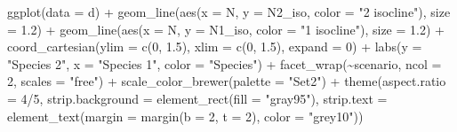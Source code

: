 \documentclass[
  letterpaper,
  DIV=11,
  numbers=noendperiod]{scrartcl}
\newenvironment{Shaded}{\begin{snugshade}}{\end{snugshade}}
\newcommand{\AttributeTok}[1]{\textcolor[rgb]{0.40,0.45,0.13}{#1}}
\newcommand{\DecValTok}[1]{\textcolor[rgb]{0.68,0.00,0.00}{#1}}
\newcommand{\FloatTok}[1]{\textcolor[rgb]{0.68,0.00,0.00}{#1}}
\newcommand{\FunctionTok}[1]{\textcolor[rgb]{0.28,0.35,0.67}{#1}}
\newcommand{\NormalTok}[1]{\textcolor[rgb]{0.00,0.23,0.31}{#1}}
\newcommand{\SpecialCharTok}[1]{\textcolor[rgb]{0.37,0.37,0.37}{#1}}
\newcommand{\StringTok}[1]{\textcolor[rgb]{0.13,0.47,0.30}{#1}}
\begin{document}
\begin{Shaded}
\begin{Highlighting}[]
\FunctionTok{ggplot}\NormalTok{(}\AttributeTok{data =}\NormalTok{ d) }\SpecialCharTok{+} 
  \FunctionTok{geom\_line}\NormalTok{(}\FunctionTok{aes}\NormalTok{(}\AttributeTok{x =}\NormalTok{ N, }\AttributeTok{y =}\NormalTok{ N2\_iso, }\AttributeTok{color =} \StringTok{"2 isocline"}\NormalTok{), }\AttributeTok{size =} \FloatTok{1.2}\NormalTok{) }\SpecialCharTok{+}
  \FunctionTok{geom\_line}\NormalTok{(}\FunctionTok{aes}\NormalTok{(}\AttributeTok{x =}\NormalTok{ N, }\AttributeTok{y =}\NormalTok{ N1\_iso, }\AttributeTok{color =} \StringTok{"1 isocline"}\NormalTok{), }\AttributeTok{size =} \FloatTok{1.2}\NormalTok{) }\SpecialCharTok{+}
  \FunctionTok{coord\_cartesian}\NormalTok{(}\AttributeTok{ylim =} \FunctionTok{c}\NormalTok{(}\DecValTok{0}\NormalTok{, }\FloatTok{1.5}\NormalTok{), }\AttributeTok{xlim =} \FunctionTok{c}\NormalTok{(}\DecValTok{0}\NormalTok{, }\FloatTok{1.5}\NormalTok{), }\AttributeTok{expand =} \DecValTok{0}\NormalTok{) }\SpecialCharTok{+}
  \FunctionTok{labs}\NormalTok{(}\AttributeTok{y =} \StringTok{"Species 2"}\NormalTok{, }\AttributeTok{x =} \StringTok{"Species 1"}\NormalTok{, }\AttributeTok{color =} \StringTok{"Species"}\NormalTok{) }\SpecialCharTok{+}
  \FunctionTok{facet\_wrap}\NormalTok{(}\SpecialCharTok{\textasciitilde{}}\NormalTok{scenario, }\AttributeTok{ncol =} \DecValTok{2}\NormalTok{, }\AttributeTok{scales =} \StringTok{"free"}\NormalTok{) }\SpecialCharTok{+} 
  \FunctionTok{scale\_color\_brewer}\NormalTok{(}\AttributeTok{palette =} \StringTok{"Set2"}\NormalTok{) }\SpecialCharTok{+}
  \FunctionTok{theme}\NormalTok{(}\AttributeTok{aspect.ratio =} \DecValTok{4}\SpecialCharTok{/}\DecValTok{5}\NormalTok{,}
        \AttributeTok{strip.background =} \FunctionTok{element\_rect}\NormalTok{(}\AttributeTok{fill =} \StringTok{"gray95"}\NormalTok{),}
        \AttributeTok{strip.text =} \FunctionTok{element\_text}\NormalTok{(}\AttributeTok{margin =} \FunctionTok{margin}\NormalTok{(}\AttributeTok{b =} \DecValTok{2}\NormalTok{, }\AttributeTok{t =} \DecValTok{2}\NormalTok{), }\AttributeTok{color =} \StringTok{"grey10"}\NormalTok{))}
\end{Highlighting}
\end{Shaded}
\end{document}
